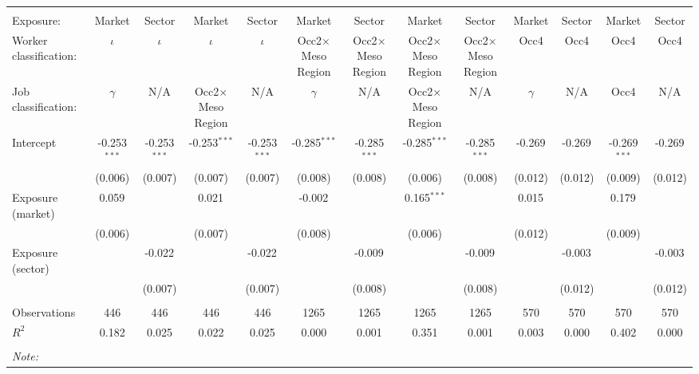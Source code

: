 \begin{tabular}{@{\extracolsep{5pt}}lcccccccccccc}
\\[-1.8ex]\hline
\hline \\[-1.8ex]
\hline \\[-1.8ex]
 Exposure: & Market & Sector & Market & Sector & Market & Sector & Market & Sector & Market & Sector & Market & Sector \\
 Worker classification: & $\iota$ & $\iota$ & $\iota$ & $\iota$ & Occ2$\times$Meso Region & Occ2$\times$Meso Region & Occ2$\times$Meso Region & Occ2$\times$Meso Region & Occ4 & Occ4 & Occ4 & Occ4 \\
 Job classification: & $\gamma$ & N/A & Occ2$\times$Meso Region & N/A & $\gamma$ & N/A & Occ2$\times$Meso Region & N/A & $\gamma$ & N/A & Occ4 & N/A \\
 Intercept & -0.253$^{***}$ & -0.253$^{***}$ & -0.253$^{***}$ & -0.253$^{***}$ & -0.285$^{***}$ & -0.285$^{***}$ & -0.285$^{***}$ & -0.285$^{***}$ & -0.269$^{}$ & -0.269$^{}$ & -0.269$^{***}$ & -0.269$^{}$ \\
& (0.006) & (0.007) & (0.007) & (0.007) & (0.008) & (0.008) & (0.006) & (0.008) & (0.012) & (0.012) & (0.009) & (0.012) \\
 Exposure (market) & 0.059$^{}$ & & 0.021$^{}$ & & -0.002$^{}$ & & 0.165$^{***}$ & & 0.015$^{}$ & & 0.179$^{}$ & \\
& (0.006) & & (0.007) & & (0.008) & & (0.006) & & (0.012) & & (0.009) & \\
 Exposure (sector) & & -0.022$^{}$ & & -0.022$^{}$ & & -0.009$^{}$ & & -0.009$^{}$ & & -0.003$^{}$ & & -0.003$^{}$ \\
& & (0.007) & & (0.007) & & (0.008) & & (0.008) & & (0.012) & & (0.012) \\
\hline \\[-1.8ex]
 Observations & 446 & 446 & 446 & 446 & 1265 & 1265 & 1265 & 1265 & 570 & 570 & 570 & 570 \\
 $R^2$ & 0.182 & 0.025 & 0.022 & 0.025 & 0.000 & 0.001 & 0.351 & 0.001 & 0.003 & 0.000 & 0.402 & 0.000 \\
\hline
\hline \\[-1.8ex]
\textit{Note:}\end{tabular}
